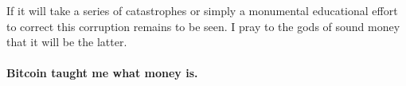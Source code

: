 If it will take a series of catastrophes or simply a monumental
educational effort to correct this corruption remains to be seen. I pray
to the gods of sound money that it will be the latter.

\paragraph{Bitcoin taught me what money is.}

%
%
%
%
